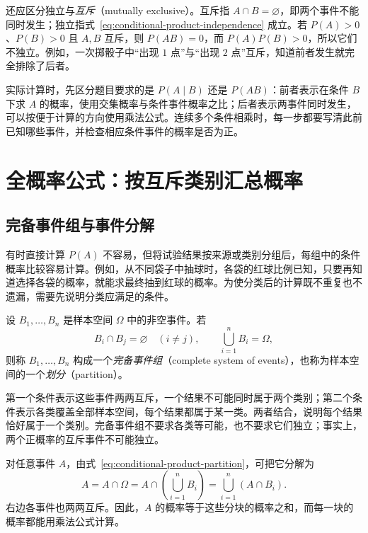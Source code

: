 \documentclass[UTF8,12pt,a4paper,fontset=fandol]{ctexart}
\begin{document}
还应区分独立与\emph{互斥}（mutually exclusive）。互斥指 $A\cap B=\varnothing$，即两个事件不能同时发生；独立指式~\eqref{eq:conditional-product-independence} 成立。若 $P(A)>0$、$P(B)>0$ 且 $A,B$ 互斥，则 $P(AB)=0$，而 $P(A)P(B)>0$，所以它们不独立。例如，一次掷骰子中“出现 $1$ 点”与“出现 $2$ 点”互斥，知道前者发生就完全排除了后者。

实际计算时，先区分题目要求的是 $P(A\mid B)$ 还是 $P(AB)$：前者表示在条件 $B$ 下求 $A$ 的概率，使用交集概率与条件事件概率之比；后者表示两事件同时发生，可以按便于计算的方向使用乘法公式。连续多个条件相乘时，每一步都要写清此前已知哪些事件，并检查相应条件事件的概率是否为正。

\section{全概率公式：按互斥类别汇总概率}
\label{sec:conditional-product-total}

\subsection{完备事件组与事件分解}

有时直接计算 $P(A)$ 不容易，但将试验结果按来源或类别分组后，每组中的条件概率比较容易计算。例如，从不同袋子中抽球时，各袋的红球比例已知，只要再知道选择各袋的概率，就能求最终抽到红球的概率。为使分类后的计算既不重复也不遗漏，需要先说明分类应满足的条件。

\begin{definition}[有限完备事件组]
\label{def:conditional-product-partition}
设 $B_1,\ldots,B_n$ 是样本空间 $\Omega$ 中的非空事件。若
\begin{equation}
  B_i\cap B_j=\varnothing\quad(i\ne j),
  \qquad
  \bigcup_{i=1}^{n}B_i=\Omega,
  \label{eq:conditional-product-partition}
\end{equation}
则称 $B_1,\ldots,B_n$ 构成一个\emph{完备事件组}（complete system of events），也称为样本空间的一个\emph{划分}（partition）。
\end{definition}

第一个条件表示这些事件两两互斥，一个结果不可能同时属于两个类别；第二个条件表示各类覆盖全部样本空间，每个结果都属于某一类。两者结合，说明每个结果恰好属于一个类别。完备事件组不要求各类等可能，也不要求它们独立；事实上，两个正概率的互斥事件不可能独立。

对任意事件 $A$，由式~\eqref{eq:conditional-product-partition}，可把它分解为
\begin{equation}
  A=A\cap\Omega
   =A\cap\left(\bigcup_{i=1}^{n}B_i\right)
   =\bigcup_{i=1}^{n}(A\cap B_i).
  \label{eq:conditional-product-decomposition}
\end{equation}
右边各事件也两两互斥。因此，$A$ 的概率等于这些分块的概率之和，而每一块的概率都能用乘法公式计算。
\end{document}
